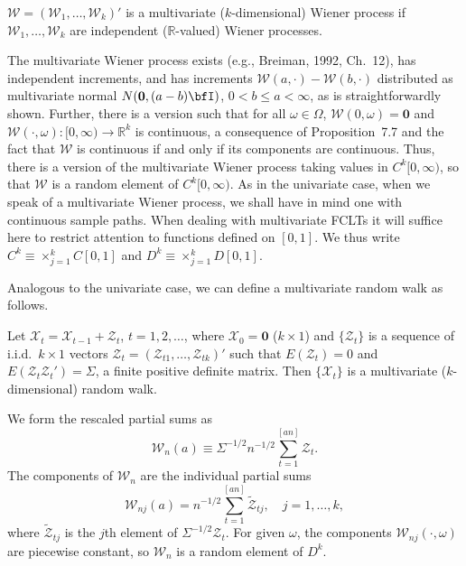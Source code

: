 \begin{definition}\label{def:multivariate-wiener}
$\boldsymbol{\mathcal{W}} = (\mathcal{W}_1, \ldots, \mathcal{W}_k)'$ is a multivariate ($k$-dimensional) Wiener process if $\mathcal{W}_1, \ldots, \mathcal{W}_k$ are independent ($\mathbb{R}$-valued) Wiener processes.
\end{definition}

The multivariate Wiener process exists (e.g., Breiman, 1992, Ch.\ 12), has independent increments, and has increments $\boldsymbol{\mathcal{W}}(a, \cdot) - \boldsymbol{\mathcal{W}}(b, \cdot)$ distributed as multivariate normal $N(\mathbf{0}, (a-b)\bfI)$, $0 < b \leq a < \infty$, as is straightforwardly shown. Further, there is a version such that for all $\omega \in \Omega$, $\boldsymbol{\mathcal{W}}(0, \omega) = \mathbf{0}$ and $\boldsymbol{\mathcal{W}}(\cdot, \omega) : [0,\infty) \to \mathbb{R}^k$ is continuous, a consequence of Proposition~7.7 and the fact that $\boldsymbol{\mathcal{W}}$ is continuous if and only if its components are continuous. Thus, there is a version of the multivariate Wiener process taking values in $C^k[0,\infty)$, so that $\boldsymbol{\mathcal{W}}$ is a random element of $C^k[0,\infty)$. As in the univariate case, when we speak of a multivariate Wiener process, we shall have in mind one with continuous sample paths. When dealing with multivariate FCLTs it will suffice here to restrict attention to functions defined on $[0,1]$. We thus write $C^k \equiv \times_{j=1}^{k} C[0,1]$ and $D^k \equiv \times_{j=1}^{k} D[0,1]$.

Analogous to the univariate case, we can define a multivariate random walk as follows.

\begin{definition}\label{def:multivariate-rw}
Let $\boldsymbol{\mathcal{X}}_t = \boldsymbol{\mathcal{X}}_{t-1} + \boldsymbol{\mathcal{Z}}_t$, $t = 1, 2, \ldots$, where $\boldsymbol{\mathcal{X}}_0 = \mathbf{0}$ ($k \times 1$) and $\{\boldsymbol{\mathcal{Z}}_t\}$ is a sequence of i.i.d.\ $k \times 1$ vectors $\boldsymbol{\mathcal{Z}}_t = (\mathcal{Z}_{t1}, \ldots, \mathcal{Z}_{tk})'$ such that $E(\boldsymbol{\mathcal{Z}}_t) = 0$ and $E(\boldsymbol{\mathcal{Z}}_t \boldsymbol{\mathcal{Z}}_t') = \Sigma$, a finite positive definite matrix. Then $\{\boldsymbol{\mathcal{X}}_t\}$ is a multivariate ($k$-dimensional) random walk.
\end{definition}

We form the rescaled partial sums as
\[
\boldsymbol{\mathcal{W}}_n(a) \equiv \Sigma^{-1/2}n^{-1/2}\sum_{t=1}^{[an]} \boldsymbol{\mathcal{Z}}_t.
\]
The components of $\boldsymbol{\mathcal{W}}_n$ are the individual partial sums
\[
\mathcal{W}_{nj}(a) = n^{-1/2}\sum_{t=1}^{[an]} \tilde{\mathcal{Z}}_{tj}, \quad j = 1, \ldots, k,
\]
where $\tilde{\mathcal{Z}}_{tj}$ is the $j$th element of $\Sigma^{-1/2}\boldsymbol{\mathcal{Z}}_t$. For given $\omega$, the components $\mathcal{W}_{nj}(\cdot, \omega)$ are piecewise constant, so $\boldsymbol{\mathcal{W}}_n$ is a random element of $D^k$.

